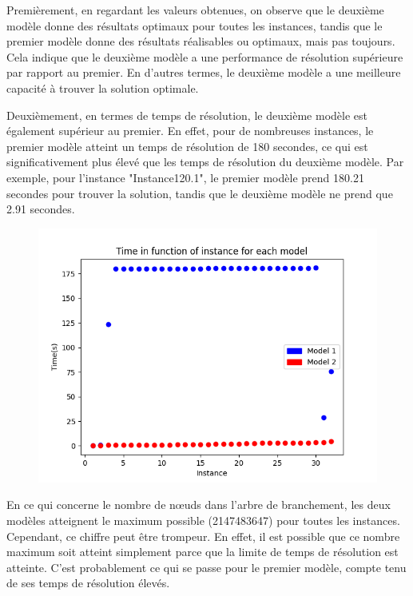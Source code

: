 \documentclass[10pt]{article}
\begin{document}
Premièrement, en regardant les valeurs obtenues, on observe que le deuxième modèle donne des résultats optimaux pour toutes les instances, tandis que le premier modèle donne des résultats réalisables ou optimaux, mais pas toujours. Cela indique que le deuxième modèle a une performance de résolution supérieure par rapport au premier. En d'autres termes, le deuxième modèle a une meilleure capacité à trouver la solution optimale.

Deuxièmement, en termes de temps de résolution, le deuxième modèle est également supérieur au premier. En effet, pour de nombreuses instances, le premier modèle atteint un temps de résolution de 180 secondes, ce qui est significativement plus élevé que les temps de résolution du deuxième modèle. Par exemple, pour l'instance "Instance120.1", le premier modèle prend 180.21 secondes pour trouver la solution, tandis que le deuxième modèle ne prend que 2.91 secondes.

\begin{figure}
  \centering
  \includegraphics[max width=\textwidth]{9D8x0pnOb04nH-VZ__k-QFB-TwYsvFdQ5S8UGUK4j30_original_fullsize}
\end{figure}

En ce qui concerne le nombre de nœuds dans l'arbre de branchement, les deux modèles atteignent le maximum possible (2147483647) pour toutes les instances. Cependant, ce chiffre peut être trompeur. En effet, il est possible que ce nombre maximum soit atteint simplement parce que la limite de temps de résolution est atteinte. C'est probablement ce qui se passe pour le premier modèle, compte tenu de ses temps de résolution élevés.
\end{document}
